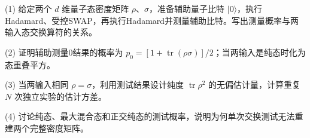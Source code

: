 (1) 给定两个 \(d\) 维量子态密度矩阵 \(\rho\)、\(\sigma\)，准备辅助量子比特 \(|0\rangle\)，执行Hadamard、受控SWAP，再执行Hadamard并测量辅助比特。写出测量概率与两输入态交换算符的关系。

(2) 证明辅助测量0结果的概率为 \(p_0=[1+\operatorname{tr}(\rho\sigma)]/2\)；当两输入是纯态时化为态重叠平方。

(3) 当两输入相同 \(\rho=\sigma\)，利用测试结果设计纯度 \(\operatorname{tr}\rho^2\) 的无偏估计量，计算重复 \(N\) 次独立实验的估计方差。

(4) 讨论纯态、最大混合态和正交纯态的测试概率，说明为何单次交换测试无法重建两个完整密度矩阵。
